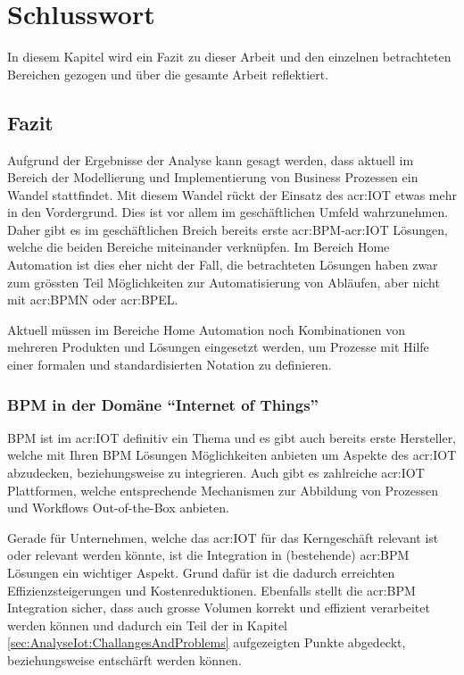 
\chapter{Schlusswort} \label{chap:Finish}
In diesem Kapitel wird ein Fazit zu dieser Arbeit und den einzelnen betrachteten Bereichen gezogen und über die gesamte Arbeit reflektiert.

\section{Fazit}
Aufgrund der Ergebnisse der Analyse kann gesagt werden, dass aktuell im Bereich der Modellierung und Implementierung von Business Prozessen ein Wandel stattfindet. Mit diesem Wandel rückt der Einsatz des \gls{acr:IOT} etwas mehr in den Vordergrund. Dies ist vor allem im geschäftlichen Umfeld wahrzunehmen. Daher gibt es im geschäftlichen Breich bereits erste \gls{acr:BPM}-\gls{acr:IOT} Lösungen, welche die beiden Bereiche miteinander verknüpfen. Im Bereich Home Automation ist dies eher nicht der Fall, die betrachteten Lösungen haben zwar zum grössten Teil Möglichkeiten zur Automatisierung von Abläufen, aber nicht mit \gls{acr:BPMN} oder \gls{acr:BPEL}.

Aktuell müssen im Bereiche Home Automation noch Kombinationen von mehreren Produkten und Lösungen eingesetzt werden, um Prozesse mit Hilfe einer formalen und standardisierten Notation zu definieren.

\subsection{BPM in der Domäne "`Internet of Things"'}
BPM ist im \gls{acr:IOT} definitiv ein Thema und es gibt auch bereits erste Hersteller, welche mit Ihren BPM Lösungen Möglichkeiten anbieten um Aspekte des \gls{acr:IOT} abzudecken, beziehungsweise zu integrieren. Auch gibt es zahlreiche \gls{acr:IOT} Plattformen, welche entsprechende Mechanismen zur Abbildung von Prozessen und Workflows Out-of-the-Box anbieten.

Gerade für Unternehmen, welche das \gls{acr:IOT} für das Kerngeschäft relevant ist oder relevant werden könnte, ist die Integration in (bestehende) \gls{acr:BPM} Lösungen ein wichtiger Aspekt. Grund dafür ist die dadurch erreichten Effizienzsteigerungen und Kostenreduktionen. Ebenfalls stellt die \gls{acr:BPM} Integration sicher, dass auch grosse Volumen korrekt und effizient verarbeitet werden können und dadurch ein Teil der in Kapitel \ref{sec:AnalyseIot:ChallangesAndProblems}  aufgezeigten Punkte abgedeckt, beziehungsweise entschärft werden können.


